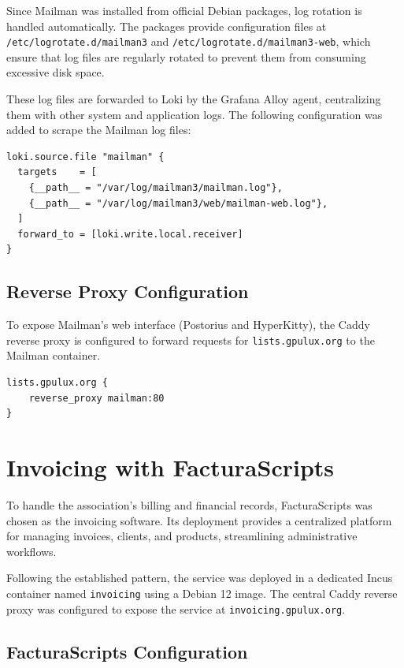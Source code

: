 Since Mailman was installed from official Debian packages, log rotation is handled automatically. The packages provide configuration files at \texttt{/etc/logrotate.d/mailman3} and \texttt{/etc/logrotate.d/mailman3-web}, which ensure that log files are regularly rotated to prevent them from consuming excessive disk space.

These log files are forwarded to Loki by the Grafana Alloy agent, centralizing them with other system and application logs. The following configuration was added to scrape the Mailman log files:

\begin{lstlisting}[caption={Grafana Alloy configuration to forward Mailman logs to Loki.}]
loki.source.file "mailman" {
  targets    = [
    {__path__ = "/var/log/mailman3/mailman.log"},
    {__path__ = "/var/log/mailman3/web/mailman-web.log"},
  ]
  forward_to = [loki.write.local.receiver]
}
\end{lstlisting}

\subsection*{Reverse Proxy Configuration}

To expose Mailman's web interface (Postorius and HyperKitty), the Caddy reverse proxy is configured to forward requests for \texttt{lists.gpulux.org} to the Mailman container.

\begin{lstlisting}[caption={Caddyfile configuration to reverse proxy Mailman 3.}]
lists.gpulux.org {
    reverse_proxy mailman:80
}
\end{lstlisting}

\section{Invoicing with FacturaScripts}

To handle the association's billing and financial records, FacturaScripts was chosen as the invoicing software. Its deployment provides a centralized platform for managing invoices, clients, and products, streamlining administrative workflows.

Following the established pattern, the service was deployed in a dedicated Incus container named \texttt{invoicing} using a Debian 12 image. The central Caddy reverse proxy was configured to expose the service at \texttt{invoicing.gpulux.org}.

\subsection*{FacturaScripts Configuration}

